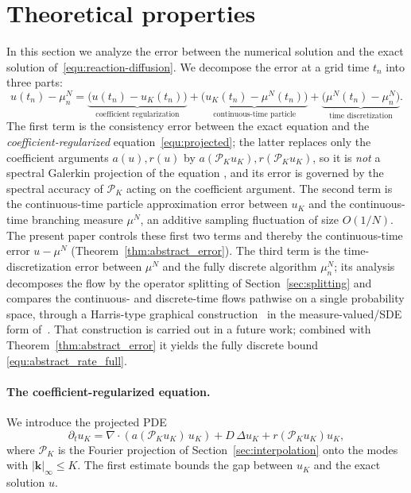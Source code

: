 \documentclass[a4paper,fleqn]{cas-sc}
\theoremstyle{definition}
\theoremstyle{remark}
\begin{document}
\section{Theoretical properties}
\label{sec:theory}
In this section we analyze the error between the numerical solution and the exact
solution of~\eqref{equ:reaction-diffusion}. We decompose the error at a grid time
$t_n$ into three parts:
\begin{equation}\label{eq:err-decomp}
u(t_n)-\mu_n^N
=\underbrace{\bigl(u(t_n)-u_K(t_n)\bigr)}_{\text{coefficient regularization}}
+\underbrace{\bigl(u_K(t_n)-\mu^N(t_n)\bigr)}_{\text{continuous-time particle}}
+\underbrace{\bigl(\mu^N(t_n)-\mu_n^N\bigr)}_{\text{time discretization}}.
\end{equation}
The first term is the consistency error between the exact equation and the
\emph{coefficient-regularized} equation~\eqref{equ:projected}; the latter replaces
only the coefficient arguments $a(u),r(u)$ by $a(\mathcal P_K u_K),r(\mathcal P_K
u_K)$, so it is \emph{not} a spectral Galerkin projection of the equation , and its error is governed by the spectral accuracy
of $\mathcal P_K$ acting on the coefficient argument. The second term is the
continuous-time particle approximation error between $u_K$ and the continuous-time
branching measure $\mu^N$, an additive sampling fluctuation of size $O(1/N)$. The
present paper controls these first two terms and thereby the continuous-time error
$u-\mu^N$ (Theorem~\ref{thm:abstract_error}). The third term is the
time-discretization error between $\mu^N$ and the fully discrete algorithm
$\mu^N_n$; its analysis decomposes the flow by the operator splitting of
Section~\ref{sec:splitting} and compares the continuous- and discrete-time flows
pathwise on a single probability space, through a Harris-type graphical
construction~\cite{harris1972nearest,bansaye2015stochastic} in the
measure-valued/SDE form of~\cite{fournier2004microscopic}. That construction is
carried out in a future work; combined
with Theorem~\ref{thm:abstract_error} it yields the fully discrete bound
\eqref{equ:abstract_rate_full}.

\paragraph{The coefficient-regularized equation.}
We introduce the projected PDE
\begin{equation}\label{equ:projected}
\partial_t u_K = \nabla\cdot\!\left( a(\mathcal P_K u_K)\, u_K\right)
+ D\,\Delta u_K + r\!\left(\mathcal P_K u_K\right) u_K,
\end{equation}
where $\mathcal P_K$ is the Fourier projection of Section~\ref{sec:interpolation}
onto the modes with $|\mathbf k|_\infty\le K$. The first estimate bounds the gap
between $u_K$ and the exact solution $u$.
\end{document}
